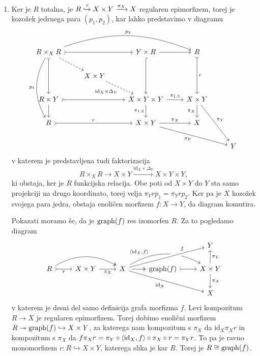 \documentclass[../kategoricna_logika.tex]{subfiles}
\begin{document}
\begin{dokaz}
\begin{enumerate}[label=(\roman*)]
  \item Ker je $R$ totalna, je
    $R \xhookrightarrow{r} X \times Y \xrightarrow{\pi_X} X$ regularen
    epimorfizem, torej je kozožek jedrnega para $(p_1, p_2)$, kar
    lahko predstavimo v diagramu
    \begin{equation*}
      \begin{tikzcd}[column sep=normal]
        R \times_X R \ar[ddd, bend right=30, "p_1"'] \ar[dd, tail]
        \ar[dr, dashed] \ar[rr, tail]
        \ar[rrr, bend left=20, "p_2"] & &  Y \times R \ar[dd, hook] \ar[r] & R \ar[dd, tail, "r"] & \\
        & X \times Y \ar[dr, dashed, "\mathrm{id}_X \times \Delta_Y"'] & & & \\
        R \times Y \ar[d] \ar[rr, tail] & & X \times Y \times Y \ar[d,
        "\pi_{1,2}"']
        \ar[r, "\pi_{1,3}"] & X\times Y \ar[d, "\pi_X"'] \ar[ddr, "\pi_Y"] & \\
        R \ar[rr, tail, "r"] & & X \times Y \ar[r, "\pi_X"] \ar[drr, "\pi_Y"'] & X & \\
        & & & & Y
      \end{tikzcd}
    \end{equation*}
    v katerem je predstavljena tudi faktorizacija
    $$R \times_X R \to X \times Y \xrightarrow{\mathrm{id}_X \times \Delta_Y} X \times Y \times Y,$$
    ki obstaja, ker je $R$ funkcijska relacija.  Obe poti od
    $X \times Y$ do $Y$ sta samo projekciji na drugo koordinato, torej
    velja $\pi_Y r p_1 = \pi_Y r p_2$.  Ker pa je $X$ kozožek svojega
    para jedra, obstaja enoličen morfizem $f : X \to Y$, da diagram
    komutira.

    Pokazati moramo še, da je $\operatorname{graph}(f)$ res izomorfen $R$. Za to
    pogledamo diagram
    \begin{equation*}
      \begin{tikzcd}
        & & & & Y \\
        R \ar[r, tail, "r"'] \ar[rr, two heads, bend left] & X \times
        Y \ar[r, "\pi_X"'] & X \ar[r, two heads] \ar[rr, bend left,
        pos=0.3, "\fprod{\mathrm{id}_X, f}"] \ar[urr, crossing over,
        pos=0.75, "f"] \ar[drr, "\mathrm{id}_X"'] &
        \operatorname{graph}(f) \ar[r, tail] & X \times Y \ar[d, "\pi_X"] \ar[u, "\pi_Y"'] \\
        & & & & X
      \end{tikzcd}
    \end{equation*}
    v katerem je desni del samo definicija grafa morfizma $f$.  Levi
    kompozitum $R \to X$ je regularen epimorfizem.  Torej dobimo
    enolični morfizem
    $R \twoheadrightarrow \operatorname{graph}(f) \hookrightarrow X \times Y$, za
    katerega nam kompozitum s $\pi_X$ da $\mathrm{id}_X \pi_X r$ in
    kompozitum s $\pi_X$ da
    $f \pi_X r = \pi_Y \circ \langle \mathrm{id}_X, f \rangle \circ \pi_X
    \circ r = \pi_Y r$.  To pa je ravno monomorfizem
    $r : R \hookrightarrow X \times Y$, katerega slika je kar $R$.
    Torej je $R \cong \operatorname{graph}(f)$.
  \end{enumerate}
\end{dokaz}
\end{document}
